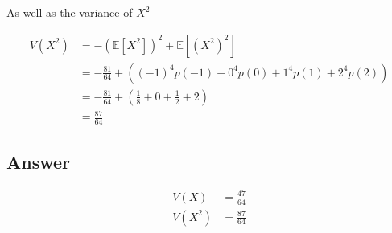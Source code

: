 \documentclass[12pt]{article}
\newcommand{\bE}{\mathbb{E}}
\begin{document}
\begin{enumerate}[start=1,label={\bfseries Part \arabic*:},leftmargin=0in]
			As well as the variance of $X^2$
			
			\[
				\begin{aligned}
					V(X^2) &= - \left(\bE\left[X^2\right]\right)^2 + \bE\left[\left(X^2\right)^2\right]\\
					&= -\frac{81}{64} + \left((-1)^4p(-1) + 0^4p(0) + 1^4p(1) + 2^4p(2)\right)\\
					&= -\frac{81}{64} + \left(\frac{1}{8} + 0 + \frac{1}{2} + 2\right)\\
					&= \frac{87}{64}
				\end{aligned}
			\]
		
		\subsection*{Answer}
		
			\[\boxed{\begin{aligned}
					V(X) &= \frac{47}{64}\\
					V(X^2) &= \frac{87}{64}
			\end{aligned}}\]

	\end{enumerate}
	
\end{document}
